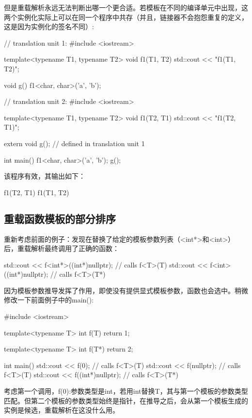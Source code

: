 但是重载解析永远无法判断出哪一个更合适。若模板在不同的编译单元中出现，这两个实例化实际上可以在同一个程序中共存（并且，链接器不会抱怨重复的定义，这是因为实例化的签名不同）:

\begin{cpp}
// translation unit 1:
#include <iostream>

template<typename T1, typename T2>
void f1(T1, T2)
{
	std::cout << "f1(T1, T2)\n";
}

void g()
{
	f1<char, char>('a', 'b');
}

// translation unit 2:
#include <iostream>

template<typename T1, typename T2>
void f1(T2, T1)
{
	std::cout << "f1(T2, T1)\n";
}

extern void g(); // defined in translation unit 1

int main()
{
	f1<char, char>('a', 'b');
	g();
}
\end{cpp}

该程序有效，其输出如下：

\begin{shell}
f1(T2, T1)
f1(T1, T2)
\end{shell}

\subsection{重载函数模板的部分排序}

重新考虑前面的例子：发现在替换了给定的模板参数列表（<int*>和<int>）后，重载解析最终调用了正确的函数：

\begin{shell}
std::cout << f<int*>((int*)nullptr); // calls f<T>(T)
std::cout << f<int>((int*)nullptr); // calls f<T>(T*)
\end{shell}

因为模板参数推导发挥了作用，即使没有提供显式模板参数，函数也会选中。稍微修改一下前面例子中的main():

\begin{cpp}
#include <iostream>

template<typename T>
int f(T)
{
	return 1;
}

template<typename T>
int f(T*)
{
	return 2;
}

int main()
{
	std::cout << f(0); // calls f<T>(T)
	std::cout << f(nullptr); // calls f<T>(T)
	std::cout << f((int*)nullptr); // calls f<T>(T*)
}
\end{cpp}

考虑第一个调用，f(0):参数类型是int，若用int替换T，其与第一个模板的参数类型匹配。但第二个模板的参数类型始终是指针，在推导之后，会从第一个模板生成的实例是候选，重载解析在这没什么用。

